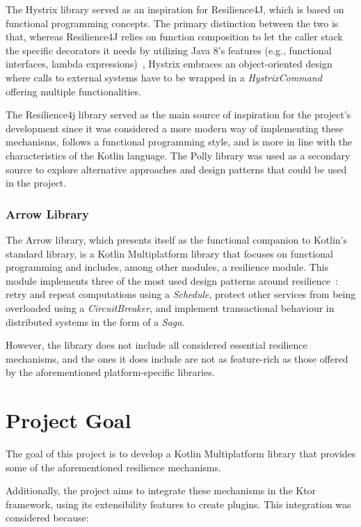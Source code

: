 The Hystrix library served as an inspiration for Resilience4J, which is based on functional programming concepts.
The primary distinction between the two is that, whereas Resilience4J relies on function composition to let the caller stack the specific decorators it needs by utilizing Java 8's features (e.g., functional interfaces, lambda expressions)~\cite{resilience4j-vs-hystrix}, Hystrix embraces an object-oriented design where calls to external systems have to be wrapped in a \textit{HystrixCommand} offering multiple functionalities.

The Resilience4j library served as the main source of inspiration for the project's development since it was considered a more modern way of implementing these mechanisms, follows a functional programming style, and is more in line with the characteristics of the Kotlin language.
The Polly library was used as a secondary source to explore alternative approaches and design patterns that could be used in the project.

\subsubsection{Arrow Library}

The Arrow library,
which presents itself as the functional companion to Kotlin's standard library, is a Kotlin Multiplatform library that
focuses on functional programming and includes, among other modules, a resilience module.
This module implements three of the most used design patterns around resilience~\cite{arrow-resilience}:
retry and repeat computations using a \textit{Schedule},
protect other services from being overloaded using a \textit{CircuitBreaker},
and implement transactional behaviour in distributed systems in the form of a \textit{Saga}.

However, the library does not include all considered essential resilience mechanisms, and the ones it does include are
not as feature-rich as those offered by the aforementioned platform-specific libraries.


\section{Project Goal}\label{sec:project-goal}

The goal of this project is
to develop a Kotlin Multiplatform library that provides some of the aforementioned resilience mechanisms.

Additionally, the project aims to integrate these mechanisms in the Ktor framework, using its extensibility features to create plugins.
This integration was considered because:

